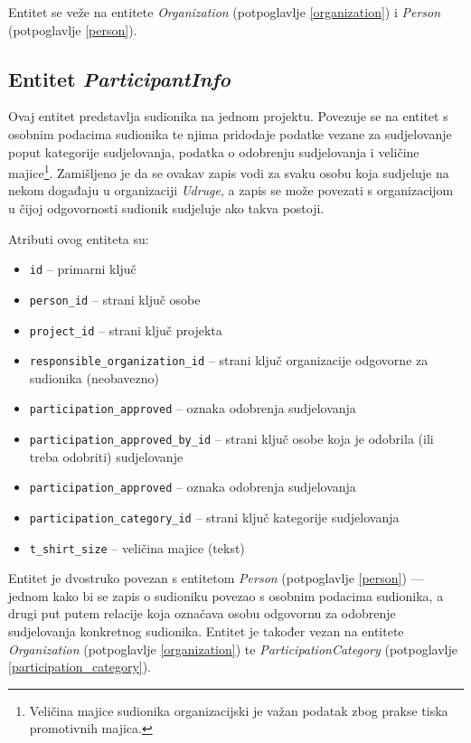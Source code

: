 \documentclass[times, utf8, diplomski]{fer}
\begin{document}
Entitet se veže na entitete \emph{Organization} (potpoglavlje
\ref{organization}) i \emph{Person} (potpoglavlje \ref{person}).

\subsection{Entitet \emph{ParticipantInfo}} \label{participant_info}
Ovaj entitet predstavlja sudionika na jednom projektu. Povezuje se na entitet s
osobnim podacima sudionika te njima pridodaje podatke vezane za sudjelovanje
poput kategorije sudjelovanja, podatka o odobrenju sudjelovanja i veličine
majice\footnote{Veličina majice sudionika organizacijski je važan podatak zbog
    prakse tiska promotivnih majica.}. Zamišljeno je da se ovakav zapis vodi za
svaku osobu koja sudjeluje na nekom događaju u organizaciji \emph{Udruge}, a
zapis se može povezati s organizacijom u čijoj odgovornosti sudionik sudjeluje
ako takva postoji.

\medskip
Atributi ovog entiteta su:
\begin{itemize}
    \item \texttt{id} -- primarni ključ
    \item \texttt{person\_id} -- strani ključ osobe
    \item \texttt{project\_id} -- strani ključ projekta
    \item \texttt{responsible\_organization\_id} -- strani ključ organizacije
        odgovorne za sudionika (neobavezno)
    \item \texttt{participation\_approved} -- oznaka odobrenja sudjelovanja
    \item \texttt{participation\_approved\_by\_id} -- strani ključ osobe koja je
        odobrila (ili treba odobriti) sudjelovanje
    \item \texttt{participation\_approved} -- oznaka odobrenja sudjelovanja
    \item \texttt{participation\_category\_id} -- strani ključ kategorije
        sudjelovanja
    \item \texttt{t\_shirt\_size} -- veličina majice (tekst)
\end{itemize}

Entitet je dvostruko povezan s entitetom \emph{Person} (potpoglavlje
\ref{person}) --- jednom kako bi se zapis o sudioniku povezao s osobnim podacima
sudionika, a drugi put putem relacije koja označava osobu odgovornu za
odobrenje sudjelovanja konkretnog sudionika. Entitet je također vezan na entitete
\emph{Organization} (potpoglavlje \ref{organization}) te
\emph{ParticipationCategory} (potpoglavlje \ref{participation_category}).
\end{document}
